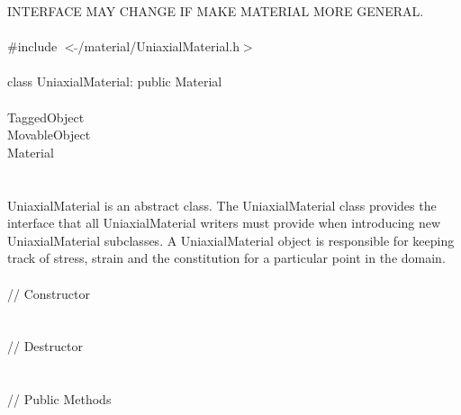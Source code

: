 
INTERFACE MAY CHANGE IF MAKE MATERIAL MORE GENERAL. \\

   \\
\indent \#include $<\tilde{ }$/material/UniaxialMaterial.h$>$  \\

  \\
\indent class UniaxialMaterial: public Material \\

 \\
\indent TaggedObject \\
\indent MovableObject \\
\indent\indent Material \\
\indent\indent{} \\

  \\
\indent UniaxialMaterial is an abstract class. The
UniaxialMaterial class provides the interface that all
UniaxialMaterial writers must provide when introducing new
UniaxialMaterial subclasses. A UniaxialMaterial object 
is responsible for keeping track of stress, strain and the
constitution for a particular point in the domain. \\ 

 \\
\indent // Constructor \\
  \\ \\
\indent // Destructor \\
\\ \\
\indent // Public Methods \\
 \\
 \\
 \\
 \\
 \\
 \\
 \\


